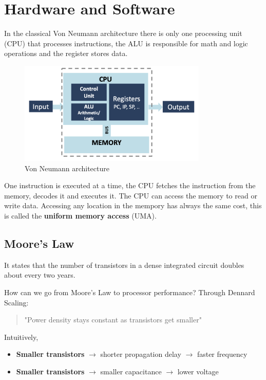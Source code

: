 
\chapter{Hardware and Software}

In the classical Von Neumann architecture there is only one processing unit (CPU) that processes instructions, the ALU is responsible for math and logic operations and the register stores data.

\begin{figure}[H]
    \centering
    \includegraphics[width=0.8\textwidth]{assets/fig2.png}
    \caption{Von Neumann architecture}
    \label{fig:von_neumann_architecture}
\end{figure}

One instruction is executed at a time, the CPU fetches the instruction from the memory, decodes it and executes it. The CPU can access the memory to read or write data. Accessing any location in the mempory has always the same cost, this is called the \textbf{uniform memory access} (UMA).

\section{Moore's Law}

\begin{definitionblock}
    It states that the number of transistors in a dense integrated circuit doubles about every two years.
\end{definitionblock}

How can we go from Moore's Law to processor performance? Through Dennard Scaling:
\begin{quotation}
    "Power density stays constant as transistors get smaller"
\end{quotation}

Intuitively, 
\begin{itemize}
    \item \textbf{Smaller transistors} $\to$ shorter propagation delay $\to$ faster frequency
    \item \textbf{Smaller transistors} $\to$ smaller capacitance $\to$ lower voltage
\end{itemize}

